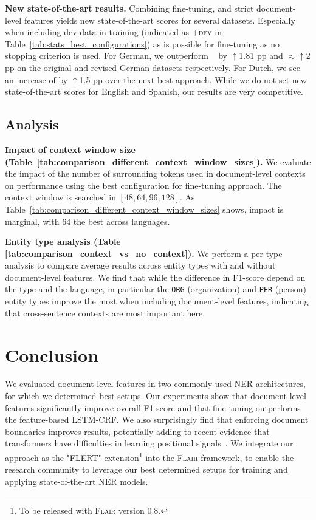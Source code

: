 \noindent 
\textbf{New state-of-the-art results.} 
Combining fine-tuning, and strict document-level features yields new state-of-the-art scores for several datasets. Especially when including dev data in training (indicated as \textsc{+dev} in Table~\ref{tab:stats_best_configurations}) as is possible for fine-tuning as no stopping criterion is used. For German, we outperform ~\cite{yu-etal-2020-named} by $\uparrow$1.81 pp and $\approx \uparrow$2 pp on the original and revised German datasets respectively. For Dutch, we see an increase of by $\uparrow$1.5 pp over the next best approach. While we do not set new state-of-the-art scores for English and Spanish, our results are very competitive. 

\subsection{Analysis}
\vspace{-1mm}
\noindent
\textbf{Impact of context window size (Table~\ref{tab:comparison_different_context_window_sizes}).}
We evaluate the impact of the number of surrounding tokens used in document-level contexts on
performance using the best configuration for fine-tuning approach. The context window is searched in $[48, 64, 96, 128]$. As Table~\ref{tab:comparison_different_context_window_sizes} shows, impact is marginal, with 64 the best across languages. 

\noindent
\textbf{Entity type analysis (Table \ref{tab:comparison_context_vs_no_context}).}
We perform a per-type analysis to compare average results across entity types with and without document-level features. We find that while the difference in F1-score depend on the type and the language, in particular the 
{\tt ORG} (organization) and {\tt PER} (person) entity types improve the most when including document-level features, indicating that cross-sentence contexts are most important here.

\vspace{-1mm}
\section{Conclusion}
\vspace{-1mm}

We evaluated document-level features in two commonly used NER architectures, for which we determined best setups. Our experiments show that document-level features significantly improve overall F1-score and that fine-tuning outperforms the feature-based LSTM-CRF. We also surprisingly find that enforcing document boundaries improves results, potentially adding to recent evidence that transformers have difficulties in learning positional signals~\cite{huang-etal-2020-improve}. We integrate our approach as the "FLERT"-extension\footnote{To be released with \textsc{Flair} version 0.8.} into the \textsc{Flair} framework, to enable the research community to leverage our best determined setups for training and applying state-of-the-art NER models. 

